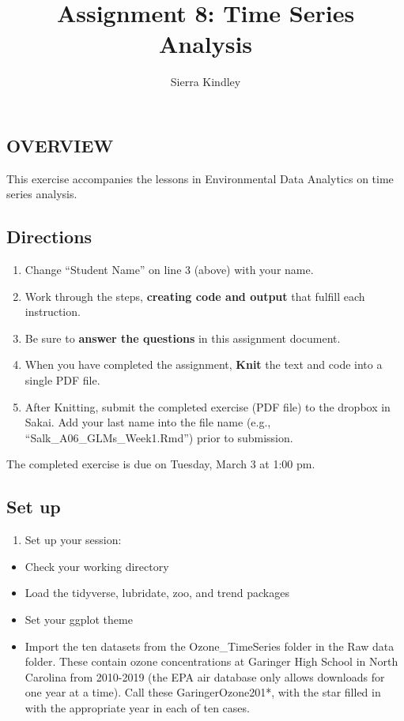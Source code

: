 \documentclass[
]{article}
\title{Assignment 8: Time Series Analysis}
\author{Sierra Kindley}
\date{}
\providecommand{\tightlist}{%
  \setlength{\itemsep}{0pt}\setlength{\parskip}{0pt}}
\begin{document}
\maketitle

\hypertarget{overview}{%
\subsection{OVERVIEW}\label{overview}}

This exercise accompanies the lessons in Environmental Data Analytics on
time series analysis.

\hypertarget{directions}{%
\subsection{Directions}\label{directions}}

\begin{enumerate}
\def\labelenumi{\arabic{enumi}.}
\tightlist
\item
  Change ``Student Name'' on line 3 (above) with your name.
\item
  Work through the steps, \textbf{creating code and output} that fulfill
  each instruction.
\item
  Be sure to \textbf{answer the questions} in this assignment document.
\item
  When you have completed the assignment, \textbf{Knit} the text and
  code into a single PDF file.
\item
  After Knitting, submit the completed exercise (PDF file) to the
  dropbox in Sakai. Add your last name into the file name (e.g.,
  ``Salk\_A06\_GLMs\_Week1.Rmd'') prior to submission.
\end{enumerate}

The completed exercise is due on Tuesday, March 3 at 1:00 pm.

\hypertarget{set-up}{%
\subsection{Set up}\label{set-up}}

\begin{enumerate}
\def\labelenumi{\arabic{enumi}.}
\tightlist
\item
  Set up your session:
\end{enumerate}

\begin{itemize}
\tightlist
\item
  Check your working directory
\item
  Load the tidyverse, lubridate, zoo, and trend packages
\item
  Set your ggplot theme
\item
  Import the ten datasets from the Ozone\_TimeSeries folder in the Raw
  data folder. These contain ozone concentrations at Garinger High
  School in North Carolina from 2010-2019 (the EPA air database only
  allows downloads for one year at a time). Call these
  GaringerOzone201*, with the star filled in with the appropriate year
  in each of ten cases.
\end{itemize}
\end{document}
